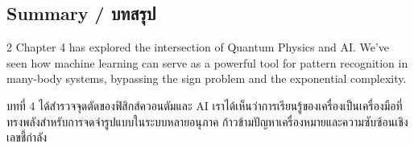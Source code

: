 \subsection{Summary \quad / \quad \textthai{บทสรุป}}
\begin{paracol}{2}
Chapter 4 has explored the intersection of Quantum Physics and AI. We've seen how machine learning can serve as a powerful tool for pattern recognition in many-body systems, bypassing the sign problem and the exponential complexity.

\switchcolumn

\begin{thai}
บทที่ 4 ได้สำรวจจุดตัดของฟิสิกส์ควอนตัมและ AI เราได้เห็นว่าการเรียนรู้ของเครื่องเป็นเครื่องมือที่ทรงพลังสำหรับการจดจำรูปแบบในระบบหลายอนุภาค ก้าวข้ามปัญหาเครื่องหมายและความซับซ้อนเชิงเลขชี้กำลัง
\end{thai}
\end{paracol}
